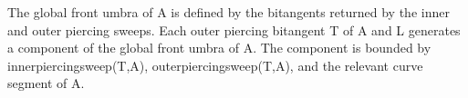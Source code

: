 \documentclass[9pt,twocolumn]{article}
\begin{document}
%




The global front umbra of A is defined by the bitangents returned by the inner 
and outer piercing sweeps.
Each outer piercing bitangent T of A and L generates a component
of the global front umbra of A.
The component is bounded by innerpiercingsweep(T,A),
outerpiercingsweep(T,A), and the relevant curve segment of A.
\end{document}
